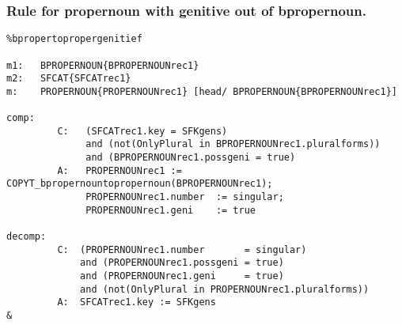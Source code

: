 \subsubsection{Rule for propernoun with genitive out of bpropernoun.}
\begin{verbatim}
%bpropertopropergenitief

m1:   BPROPERNOUN{BPROPERNOUNrec1}
m2:   SFCAT{SFCATrec1}
m:    PROPERNOUN{PROPERNOUNrec1} [head/ BPROPERNOUN{BPROPERNOUNrec1}]

comp:    
         C:   (SFCATrec1.key = SFKgens)
              and (not(OnlyPlural in BPROPERNOUNrec1.pluralforms))
              and (BPROPERNOUNrec1.possgeni = true)
         A:   PROPERNOUNrec1 := COPYT_bpropernountopropernoun(BPROPERNOUNrec1);
              PROPERNOUNrec1.number  := singular;
              PROPERNOUNrec1.geni    := true

decomp:  
         C:  (PROPERNOUNrec1.number       = singular) 
             and (PROPERNOUNrec1.possgeni = true)
             and (PROPERNOUNrec1.geni     = true)
             and (not(OnlyPlural in PROPERNOUNrec1.pluralforms))
         A:  SFCATrec1.key := SFKgens
&
\end{verbatim}
\newpage
